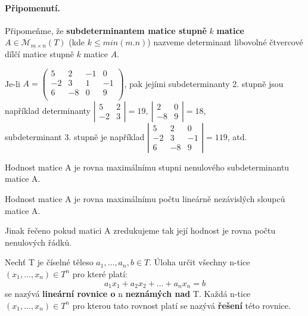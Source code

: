 \paragraph{Připomenutí.} Připomeňme, že \textbf{subdeterminantem matice stupně} $k$ \textbf{matice}  $A \in \mathscr{M}_{m \times n}(T)$ (kde $k \leq min(m.n)$) nazveme determinant libovolné čtvercové dílčí matice stupně $k$ matice $A$.

\begin{example}
Je-li $
	A = \left( \begin{array}{cccc}
	5 & 2 & -1 & 0  \\
	-2 & 3 & 1 & -1 \\
	6 & -8 & 0 & 9 \\
	\end{array}\right)
$, pak jejími subdeterminanty 2. stupně jsou například determinanty $\left| \begin{array}{cc} 5 & 2\\ -2 & 3 \end{array}\right| = 19, \ \left| \begin{array}{cc} 2 & 0\\ -8 & 9 \end{array}\right| = 18$, \\subdeterminant 3. stupně je například $\left| \begin{array}{ccc} 5 & 2 & 0\\ -2 & 3 & -1 \\ 6 & -8 & 9 \end{array}\right| = 119$, atd.
\end{example}

\begin{sentence}
	Hodnost matice A je rovna maximálnímu stupni nenulového subdeterminantu matice A.
\end{sentence}

\begin{result}
	Hodnost matice A je rovna maximálnímu počtu lineárně nezávislých sloupců matice A.
\end{result}
Jinak řečeno pokud matici A zredukujeme tak její hodnost je rovna počtu nenulových řádků.

\begin{definition}
	Nechť T je číselné těleso $a_1,\dots, a_n,b \in T$. Úloha určit všechny n-tice $(x_1, \dots, x_n) \in T^n$ pro které platí: $$a_1 x_1 + a_2 x_2 + \dots + a_n x_n = b$$ se nazývá \textbf{lineární rovnice o} n \textbf{neznámých nad} T. Každá n-tice $(x_1, \dots, x_n) \in T^n$ pro kterou tato rovnost platí se nazývá \textbf{řešení} této rovnice.
\end{definition}

